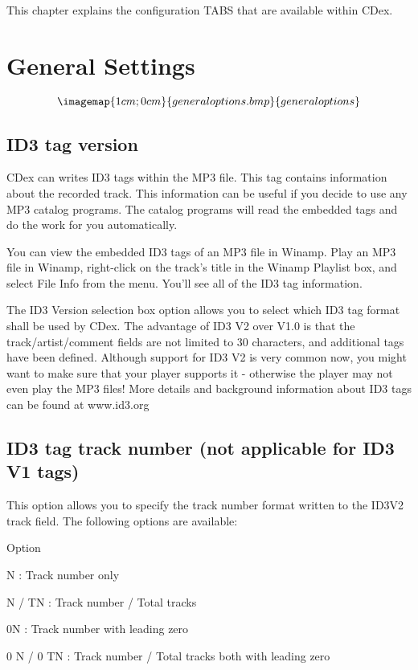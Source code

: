 This chapter explains the configuration TABS that are available within CDex.

\section{General Settings}

$$\imagemap{1cm;0cm}{generaloptions.bmp}{generaloptions}$$

\subsection{ID3 tag version}

CDex can writes ID3 tags within the MP3 file. This tag contains information about the recorded 
track. This information can be useful if you decide to use any MP3 catalog programs. The
catalog programs will read the embedded tags and do the work for you automatically.

You can view the embedded ID3 tags of an MP3 file in Winamp. Play an MP3 file in
Winamp, right-click on the track's title in the Winamp Playlist box, and select File Info
from the menu. You'll see all of the ID3 tag information.

The ID3 Version selection box option allows you to select which ID3 tag format shall be used by CDex.
The advantage of ID3 V2 over V1.0 is that the track/artist/comment fields are not limited
to 30 characters, and additional tags have been defined. Although support for ID3 V2 is very
common now, you might want to make sure that
your player supports it - otherwise the player may not even play the MP3 files! More details and 
background information about ID3 tags can be found at www.id3.org

\subsection{ID3 tag track number (not applicable for ID3 V1 tags)}
This option allows you to specify the track number format written to the ID3V2 track field. The following options
are available:

Option

N          : Track number only

N / TN     : Track number / Total tracks

0N         : Track number with leading zero

0 N / 0 TN : Track number / Total tracks both with leading zero

